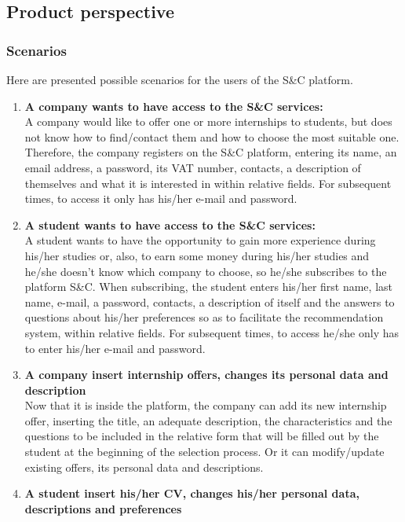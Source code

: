 \subsection{Product perspective}

\subsubsection{Scenarios}
Here are presented possible scenarios for the users of the S\&C platform.
\begin{enumerate}
    \item \textbf{A company wants to have access to the S\&C services:}\\
    A company would like to offer one or more internships to students, but does not know how to find/contact them and how to choose the most suitable one. Therefore, the company registers on the S\&C platform, entering its name, an email address, a password, its VAT number, contacts, a description of themselves and what it is interested in within relative fields. For subsequent times, to access it only has his/her e-mail and password.
    \item \textbf{A student wants to have access to the S\&C services:}\\
    A student wants to have the opportunity to gain more experience during his/her studies or, also, to earn some money during his/her studies and he/she doesn't know which company to choose, so he/she subscribes to the platform S\&C. When subscribing, the student enters his/her first name, last name, e-mail, a password, contacts, a description of itself and the answers to questions about his/her preferences so as to facilitate the recommendation system, within relative fields. For subsequent times, to access he/she only has to enter his/her e-mail and password.
    \item \textbf{A company insert internship offers, changes its personal data and description}\\
    Now that it is inside the platform, the company can add its new internship offer, inserting the title, an adequate description, the characteristics and the questions to be included in the relative form that will be filled out by the student at the beginning of the selection process. Or it can modify/update existing offers, its personal data and descriptions.
    \item \textbf{A student insert his/her CV, changes his/her personal data, descriptions and preferences}\\

\end{enumerate}
